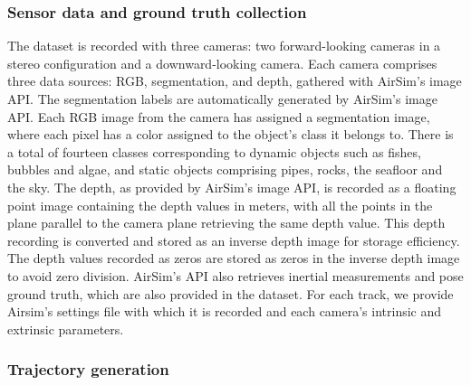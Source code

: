 \subsubsection{Sensor data and ground truth collection}
The dataset is recorded with three cameras: two forward-looking cameras in a stereo configuration and a downward-looking camera. Each camera comprises three data sources: RGB, segmentation, and depth, gathered with AirSim's image API.
The segmentation labels are automatically generated by AirSim's image API. Each RGB image from the camera has assigned a segmentation image, where each pixel has a color assigned to the object's class it belongs to. There is a total of fourteen classes corresponding to dynamic objects such as fishes, bubbles and algae, and static objects comprising pipes, rocks, the seafloor and the sky. %
The depth, as provided by AirSim's image API, is recorded as a floating point image containing the depth values in meters, with all the points in the plane parallel to the camera plane retrieving the same depth value. This depth recording is converted and stored as an inverse depth image for storage efficiency. The depth values recorded as zeros are stored as zeros in the inverse depth image to avoid zero division.
AirSim's API also retrieves inertial measurements and pose ground truth, which are also provided in the dataset. %
For each track, we provide Airsim's settings file with which it is recorded and each camera's intrinsic and extrinsic parameters.

\subsubsection{Trajectory generation}

